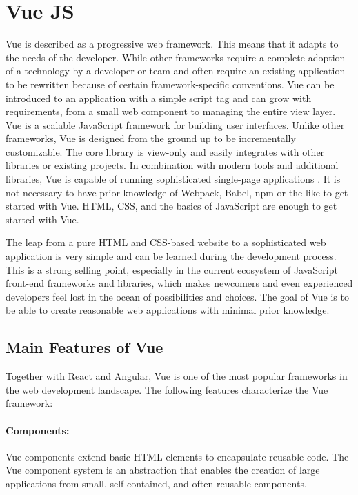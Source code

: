 	\section{Vue JS}
	\label{Grundlagen:Vue}
	Vue is described as a progressive web framework. This means that it adapts to the needs of the developer. While other frameworks require a complete adoption of a technology by a developer or team and often require an existing application to be rewritten because of certain framework-specific conventions. Vue can be introduced to an application with a simple script tag and can grow with requirements, from a small web component to managing the entire view layer. Vue is a scalable JavaScript framework for building user interfaces. Unlike other frameworks, Vue is designed from the ground up to be incrementally customizable. The core library is view-only and easily integrates with other libraries or existing projects. In combination with modern tools and additional libraries, Vue is capable of running sophisticated single-page applications \cite{Vue019:Intro:Online}.
	It is not necessary to have prior knowledge of Webpack, Babel, npm or the like to get started with Vue. HTML, CSS, and the basics of JavaScript are enough to get started with Vue.

	The leap from a pure HTML and CSS-based website to a sophisticated web application is very simple and can be learned during the development process. This is a strong selling point, especially in the current ecosystem of JavaScript front-end frameworks and libraries, which makes newcomers and even experienced developers feel lost in the ocean of possibilities and choices. The goal of Vue is to be able to create reasonable web applications with minimal prior knowledge.
	
	\subsection{Main Features of Vue}
	\label{Grundlagen:VueFeatures}
	Together with React and Angular, Vue is one of the most popular frameworks in the web development landscape. The following features characterize the Vue framework:


	
	\paragraph*{Components:} Vue components extend basic \gls{HTML} elements to encapsulate reusable code. The Vue component system is an abstraction that enables the creation of large applications from small, self-contained, and often reusable components.
